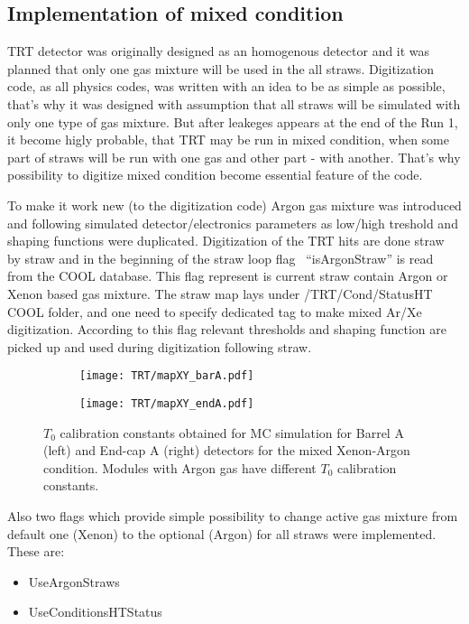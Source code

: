 \subsection{Implementation of mixed condition}
TRT detector was originally designed as an homogenous detector and it was planned that only one gas mixture will be used in the all straws. 
Digitization code, as all physics codes, was written with an idea to be as simple as possible, that's why it was designed with assumption that all straws will be simulated with only one type of gas mixture.
But after leakeges appears at the end of the Run 1, it become higly probable, that TRT may be run in mixed condition, when some part of straws will be run with one gas and other part - with another. That's why 
possibility to digitize mixed condition become essential feature of the code. 

To make it work new (to the digitization code) Argon gas mixture was introduced and following simulated detector/electronics parameters as low/high treshold and shaping functions were duplicated.
Digitization of the TRT hits are done straw by straw and in the beginning of the straw loop flag \mbox{ ``isArgonStraw''} is read from the COOL database. This flag represent is current straw contain Argon or Xenon based 
gas mixture. The straw map lays under \mbox{/TRT/Cond/StatusHT} COOL folder, and one need to specify dedicated tag to make mixed Ar/Xe digitization.
According to this flag relevant thresholds and shaping function are picked up and used during digitization following straw. 


\begin{figure}

\begin{subfigure}{.5\textwidth}
  \centering
  \texttt{[image: TRT/mapXY\_barA.pdf]}
\end{subfigure}%
\begin{subfigure}{.5\textwidth}
  \centering
  \texttt{[image: TRT/mapXY\_endA.pdf]}
\end{subfigure}

\caption{$T_{0}$ calibration constants obtained for MC simulation for Barrel A (left) and End-cap A (right) detectors for the mixed Xenon-Argon condition. 
	  Modules with Argon gas have different $T_{0}$ calibration constants.}
  \label{fig:t0_mixed_condition}
\end{figure}



Also two flags which provide simple possibility to change active gas mixture from default one (Xenon) to the optional (Argon) for all straws were implemented. These are:
\begin{itemize}
 \item UseArgonStraws
 \item UseConditionsHTStatus
\end{itemize}

